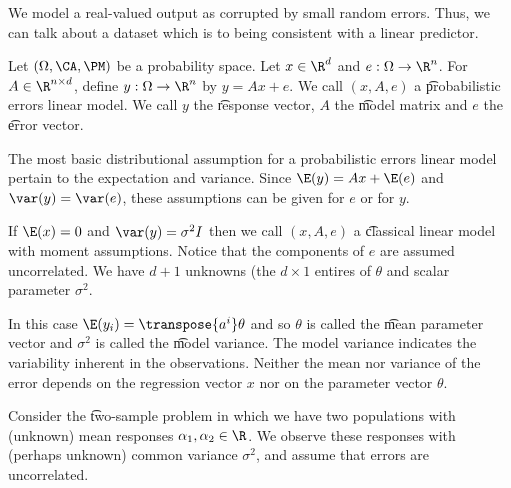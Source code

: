 

We model a real-valued output as corrupted by small random errors.
Thus, we can talk about a dataset which is  to being consistent with a linear predictor.


Let $(\Omega, \CA, \PM)$ be a probability space.
Let $x \in \R^d$ and $e: \Omega \to \R^n$.
For $A \in \R^{n \times d}$, define $y: \Omega \to \R^n$ by $y = Ax + e$.
We call $(x, A, e)$ a \t{probabilistic errors linear model}.
We call $y$ the \t{response vector}, $A$ the \t{model matrix} and $e$ the \t{error vector}.


The most basic distributional assumption for a probabilistic errors linear model pertain to the expectation and variance.
Since $\E(y) = Ax + \E(e)$ and $\var(y) = \var(e)$, these assumptions can be given for $e$ or for $y$.

If $\E(x) = 0$ and $\var(y) = \sigma^2I$ then we call $(x, A, e)$ a \t{classical linear model with moment assumptions}.
Notice that the components of $e$ are assumed uncorrelated.
We have $d + 1$ unknowns (the $d \times 1$ entires of $\theta$ and scalar parameter $\sigma^2$.

In this case $\E(y_i) = \transpose{a^i}\theta$ and so $\theta$ is called the \t{mean parameter vector} and $\sigma^2$ is called the \t{model variance}.
The model variance indicates the variability inherent in the observations.
Neither the mean nor variance of the error depends on the regression vector $x$ nor on the parameter vector $\theta$.



Consider the \t{two-sample problem} in which we have two populations with (unknown) mean responses $\alpha_1, \alpha_2 \in \R$.
We observe these responses with (perhaps unknown) common variance $\sigma^2$, and assume that errors are uncorrelated.

